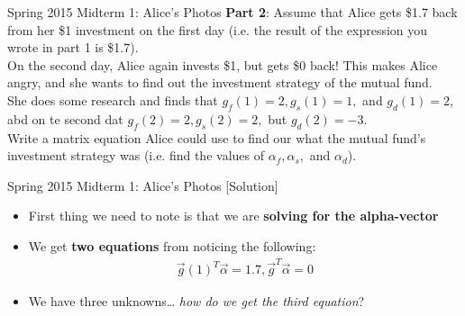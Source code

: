 \begin{frame}{Spring 2015 Midterm 1: Alice's Photos}
    \textbf{Part 2}: Assume that Alice gets \$1.7 back from her \$1 investment on the first day (i.e. the result of the expression you wrote in part 1 is \$1.7). \\[2ex]
    On the second day, Alice again invests \$1, but gets \$0 back! This makes Alice angry, and she wants to find out the investment strategy of the mutual fund. \\[1.5ex]
    She does some research and finds that $g_f(1) = 2, g_s(1) = 1,$ and $g_d(1) = 2$, abd on te second dat $g_f(2) = 2, g_s(2) = 2,$ but $g_d(2) = -3$. \\[1.5ex]
    Write a matrix equation Alice could use to find our what the mutual fund's investment strategy was (i.e. find the values of $\alpha_f, \alpha_s,$ and $\alpha_d$).
\end{frame}

\begin{frame}{Spring 2015 Midterm 1: Alice's Photos [Solution]}
    \begin{itemize}
        \color{blue}
        \item<blue@1-> First thing we need to note is that we are \textbf{solving for the alpha-vector}
        \item<blue@1-> We get \textbf{two equations} from noticing the following:
        \begin{align*}
            \vec{g}(1)^T \vec{\alpha} = 1.7, \vec{g}^T \vec{\alpha} = 0
        \end{align*}
        \item We have three unknowns… \textit{how do we get the third equation}?
    \end{itemize}
\end{frame}

